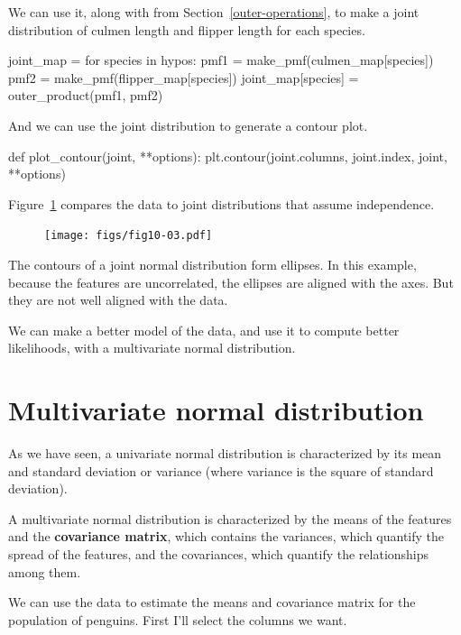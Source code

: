 \documentclass[12pt]{book}
\theoremstyle{exercise}
\begin{document}
We can use it, along with  from Section~\ref{outer-operations}, to make a joint distribution of culmen length and
flipper length for each species.

\begin{code}
joint_map = {}
for species in hypos:
    pmf1 = make_pmf(culmen_map[species])
    pmf2 = make_pmf(flipper_map[species])
    joint_map[species] = outer_product(pmf1, pmf2)
\end{code}

And we can use the joint distribution to generate a contour plot.

\begin{code}
def plot_contour(joint, **options):
    plt.contour(joint.columns, joint.index, joint, **options)
\end{code}

Figure~\ref{fig10-03} compares the data to joint distributions that
assume independence.

\begin{figure}
\centerline{\texttt{[image: figs/fig10-03.pdf]}}
\caption{}
\label{fig10-03}
\end{figure}

The contours of a joint normal distribution form ellipses.
In this example, because the features are uncorrelated, the ellipses are
aligned with the axes. But they are not well aligned with the data.

We can make a better model of the data, and use it to compute better
likelihoods, with a multivariate normal distribution.


\section{Multivariate normal distribution}
\label{multivariate-normal-distribution}

As we have seen, a univariate normal distribution is characterized by
its mean and standard deviation or variance (where variance is the
square of standard deviation).

A multivariate normal distribution is characterized by the means of the
features and the \textbf{covariance matrix}, which contains the
variances, which quantify the spread of the features, and the
covariances, which quantify the relationships among them.

We can use the data to estimate the means and covariance matrix for the
population of penguins. First I'll select the columns we want.
\end{document}
